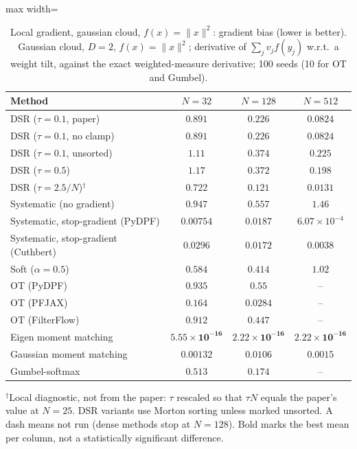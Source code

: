 \begin{table}[H]
\centering
\small
\caption{Local gradient, gaussian cloud, $f(x)=\|x\|^2$: gradient bias (lower is better). Gaussian cloud, $D{=}2$, $f(x)=\|x\|^2$; derivative of $\sum_j v_j f(y_j)$ w.r.t.\ a weight tilt, against the exact weighted-measure derivative; 100 seeds (10 for OT and Gumbel).}
\label{tab:grad-gaussian-x2-gradient_bias}
\begin{adjustbox}{max width=\linewidth}
\begin{tabular}{lccc}
\toprule
Method & $N{=}32$ & $N{=}128$ & $N{=}512$ \\
\midrule
DSR ($\tau{=}0.1$, paper) & $0.891$ & $0.226$ & $0.0824$ \\
DSR ($\tau{=}0.1$, no clamp) & $0.891$ & $0.226$ & $0.0824$ \\
DSR ($\tau{=}0.1$, unsorted) & $1.11$ & $0.374$ & $0.225$ \\
DSR ($\tau{=}0.5$) & $1.17$ & $0.372$ & $0.198$ \\
DSR ($\tau{=}2.5/N$)$^\dagger$ & $0.722$ & $0.121$ & $0.0131$ \\
\midrule
Systematic (no gradient) & $0.947$ & $0.557$ & $1.46$ \\
Systematic, stop-gradient (PyDPF) & $0.00754$ & $0.0187$ & $6.07\times10^{-4}$ \\
Systematic, stop-gradient (Cuthbert) & $0.0296$ & $0.0172$ & $0.0038$ \\
Soft ($\alpha{=}0.5$) & $0.584$ & $0.414$ & $1.02$ \\
OT (PyDPF) & $0.935$ & $0.55$ & -- \\
OT (PFJAX) & $0.164$ & $0.0284$ & -- \\
OT (FilterFlow) & $0.912$ & $0.447$ & -- \\
Eigen moment matching & $\mathbf{5.55\times10^{-16}}$ & $\mathbf{2.22\times10^{-16}}$ & $\mathbf{2.22\times10^{-16}}$ \\
Gaussian moment matching & $0.00132$ & $0.0106$ & $0.0015$ \\
Gumbel-softmax & $0.513$ & $0.174$ & -- \\
\bottomrule
\end{tabular}
\end{adjustbox}
\par\smallskip\parbox{0.95\linewidth}{\footnotesize $^\dagger$Local diagnostic, not from the paper: $\tau$ rescaled so that $\tau N$ equals the paper's value at $N{=}25$. DSR variants use Morton sorting unless marked unsorted. A dash means not run (dense methods stop at $N{=}128$). Bold marks the best mean per column, not a statistically significant difference.}
\end{table}

